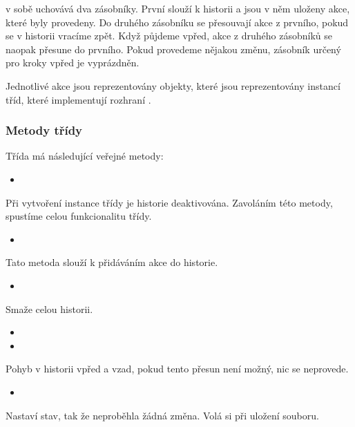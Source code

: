 \documentclass[
  field=inf,
  biblatex,
  glossaries,
  index
]{kidiplom}
\begin{document}
 v sobě uchovává dva zásobníky. První slouží k historii a jsou v něm uloženy akce, které byly provedeny. Do druhého zásobníku se přesouvají akce z prvního, pokud se v historii vracíme zpět. Když půjdeme vpřed, akce z druhého zásobníků se naopak přesune do prvního. Pokud provedeme nějakou změnu, zásobník určený pro kroky vpřed je vyprázdněn.

Jednotlivé akce jsou reprezentovány objekty, které jsou reprezentovány instancí tříd, které implementují rozhraní .

\subsubsection{Metody třídy}

Třída  má následující veřejné metody:

\begin{itemize}
\item {}
\end{itemize}
Při vytvoření instance třídy  je historie deaktivována. Zavoláním této metody, spustíme celou funkcionalitu třídy.

\begin{itemize}
\item {}
\end{itemize}
Tato metoda slouží k přidáváním akce do historie.

\begin{itemize}
\item {}
\end{itemize}
Smaže celou historii.

\begin{itemize}
\item {}
\item {}
\end{itemize}
Pohyb v historii vpřed a vzad, pokud tento přesun není možný, nic se neprovede.

\begin{itemize}
\item {}
\end{itemize}
Nastaví stav, tak že neproběhla žádná změna. Volá si při uložení souboru.
\end{document}
